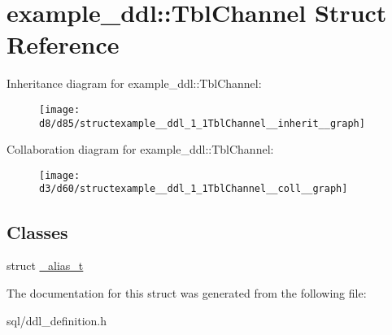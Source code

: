 \hypertarget{structexample__ddl_1_1TblChannel}{}\section{example\+\_\+ddl\+:\+:Tbl\+Channel Struct Reference}
\label{structexample__ddl_1_1TblChannel}


Inheritance diagram for example\+\_\+ddl\+:\+:Tbl\+Channel\+:
\nopagebreak
\begin{figure}[H]
\begin{center}
\leavevmode
\texttt{[image: d8/d85/structexample\_\_ddl\_1\_1TblChannel\_\_inherit\_\_graph]}
\end{center}
\end{figure}


Collaboration diagram for example\+\_\+ddl\+:\+:Tbl\+Channel\+:
\nopagebreak
\begin{figure}[H]
\begin{center}
\leavevmode
\texttt{[image: d3/d60/structexample\_\_ddl\_1\_1TblChannel\_\_coll\_\_graph]}
\end{center}
\end{figure}
\subsection*{Classes}
\begin{DoxyCompactItemize}
\item 
struct \hyperlink{structexample__ddl_1_1TblChannel_1_1__alias__t}{\+\_\+alias\+\_\+t}
\end{DoxyCompactItemize}


The documentation for this struct was generated from the following file\+:\begin{DoxyCompactItemize}
\item 
sql/ddl\+\_\+definition.\+h\end{DoxyCompactItemize}
